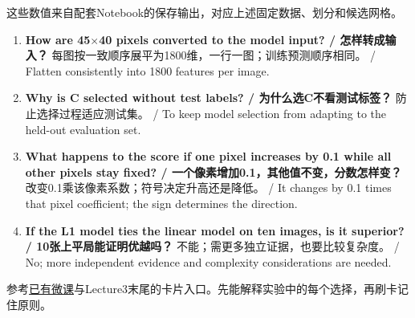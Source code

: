 这些数值来自配套Notebook的保存输出，对应上述固定数据、划分和候选网格。








\begin{enumerate}[start=1]

\item \textbf{How are 45\ensuremath{\times}40 pixels converted to the model input? / 怎样转成输入？} 每图按一致顺序展平为1800维，一行一图；训练预测顺序相同。 / Flatten consistently into 1800 features per image.

\item \textbf{Why is C selected without test labels? / 为什么选C不看测试标签？} 防止选择过程适应测试集。 / To keep model selection from adapting to the held-out evaluation set.

\item \textbf{What happens to the score if one pixel increases by 0.1 while all other pixels stay fixed? / 一个像素增加0.1，其他值不变，分数怎样变？} 改变0.1乘该像素系数；符号决定升高还是降低。 / It changes by 0.1 times that pixel coefficient; the sign determines the direction.

\item \textbf{If the L1 model ties the linear model on ten images, is it superior? / 10张上平局能证明优越吗？} 不能；需更多独立证据，也要比较复杂度。 / No; more independent evidence and complexity considerations are needed.

\end{enumerate}


参考\href{https://crazyshout.github.io/micro-course/?lesson=ml12}{已有微课}与Lecture3末尾的卡片入口。先能解释实验中的每个选择，再刷卡记住原则。


